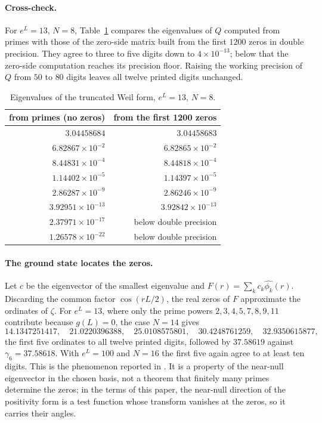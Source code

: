 \documentclass[11pt,a4paper]{article}
\theoremstyle{definition}\newtheorem{definition}[proposition]{Definition}
\theoremstyle{remark}\newtheorem{remark}[proposition]{Remark}
\begin{document}
\paragraph{Cross-check.} For $e^L=13$, $N=8$, Table~\ref{tab:weilcheck} compares the eigenvalues of $Q$ computed from primes with those of the zero-side matrix built from the first $1200$ zeros in double precision. They agree to three to five digits down to $4\times10^{-13}$; below that the zero-side computation reaches its precision floor. Raising the working precision of $Q$ from $50$ to $80$ digits leaves all twelve printed digits unchanged.

\begin{table}[ht]
\centering\small
\begin{tabular}{rr}
\toprule
from primes (no zeros) & from the first 1200 zeros\\
\midrule
$3.04458684$ & $3.04458683$\\
$6.82867\times10^{-2}$ & $6.82865\times10^{-2}$\\
$8.44831\times10^{-4}$ & $8.44818\times10^{-4}$\\
$1.14402\times10^{-5}$ & $1.14397\times10^{-5}$\\
$2.86287\times10^{-9}$ & $2.86246\times10^{-9}$\\
$3.92951\times10^{-13}$ & $3.92842\times10^{-13}$\\
$2.37971\times10^{-17}$ & below double precision\\
$1.26578\times10^{-22}$ & below double precision\\
\bottomrule
\end{tabular}
\caption{Eigenvalues of the truncated Weil form, $e^L=13$, $N=8$.}\label{tab:weilcheck}
\end{table}

\paragraph{The ground state locates the zeros.} Let $c$ be the eigenvector of the smallest eigenvalue and $F(r)=\sum_kc_k\widehat{\phi_k}(r)$. Discarding the common factor $\cos(rL/2)$, the real zeros of $F$ approximate the ordinates of $\zeta$. For $e^L=13$, where only the prime powers $2,3,4,5,7,8,9,11$ contribute because $g(L)=0$, the case $N=14$ gives
\[
14.1347251417,\quad21.0220396388,\quad25.0108575801,\quad30.4248761259,\quad32.9350615877,
\]
the first five ordinates to all twelve printed digits, followed by $37.58619$ against $\gamma_6=37.58618$. With $e^L=100$ and $N=16$ the first five again agree to at least ten digits. This is the phenomenon reported in \cite{CCM2023}. It is a property of the near-null eigenvector in the chosen basis, not a theorem that finitely many primes determine the zeros; in the terms of this paper, the near-null direction of the positivity form is a test function whose transform vanishes at the zeros, so it carries their angles.
\end{document}
